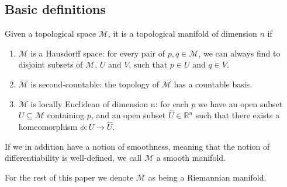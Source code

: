 \subsection{Basic definitions}




\begin{definition}
    Given a topological space $\mathcal{M}$, it is a topological manifold of dimension $n$ if
    \begin{enumerate}
        \item $\mathcal{M}$ is a Hausdorff space: for every pair of $p,q\in \mathcal{M}$, we can always find to disjoint subsets of $\mathcal{M}$, $U$ and $V$, such that $p\in U$ and $q\in V$.
        \item $\mathcal{M}$ is second-countable: the topology of $\mathcal{M}$ has a countable basis.
        \item $\mathcal{M}$ is locally Euclidean of dimension n: for each $p$ we have an open subset $U \subseteq \mathcal{M}$ containing $p$, and an open subset $\hat{U}\in \mathbb{R}^{n}$ such that there exists a homeomorphism $\phi:U \xrightarrow{}\hat{U}$.
    \end{enumerate}
    If we in addition have a notion of smoothness, meaning that the notion of differentiability is well-defined, we call $\mathcal{M}$ a smooth manifold.
\end{definition}



For the rest of this paper we denote $\mathcal{M}$ as being a Riemannian manifold.




